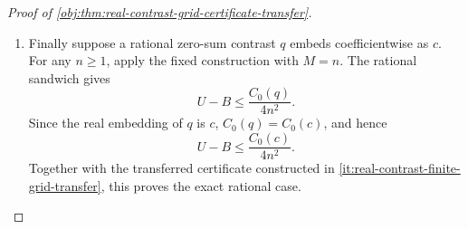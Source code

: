 \begin{proof}[Proof of \cref{obj:thm:real-contrast-grid-certificate-transfer}]
\begin{enumerate}
\item Finally suppose a rational zero-sum contrast \(q\) embeds coefficientwise as \(c\).  For any \(n\ge1\), apply the fixed construction with \(M=n\).  The rational sandwich gives
\[
U-B\le \frac{C_0(q)}{4n^2}.
\]
Since the real embedding of \(q\) is \(c\), \(C_0(q)=C_0(c)\), and hence
\[
U-B\le \frac{C_0(c)}{4n^2}.
\]
Together with the transferred certificate constructed in \cref{it:real-contrast-finite-grid-transfer}, this proves the exact rational case. %
\end{enumerate}
\end{proof}
